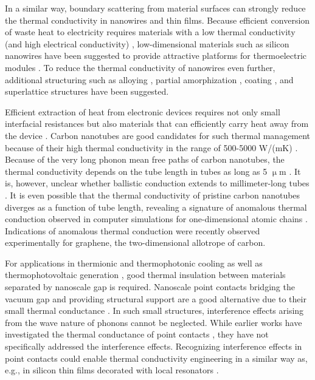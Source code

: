 In a similar way, boundary scattering from material surfaces can strongly reduce the thermal conductivity in nanowires and thin films. Because efficient conversion of waste heat to electricity requires materials with a low thermal conductivity (and high electrical conductivity) \cite{chen}, low-dimensional materials such as silicon nanowires have been suggested to provide attractive platforms for thermoelectric modules \cite{hochbaum08,boukai08}. To reduce the thermal conductivity of nanowires even further, additional structuring such as alloying \cite{garg11}, partial amorphization \cite{donadio09}, coating \cite{hu11}, and superlattice structures \cite{hu12} have been suggested.

Efficient extraction of heat from electronic devices requires not only small interfacial resistances but also materials that can efficiently carry heat away from the device \cite{pop10}. Carbon nanotubes  \cite{iijima91} are good candidates for such thermal management \cite{kumar11} because of their high thermal conductivity in the range of 500-5000 W/(mK) \cite{marconnet13}. Because of the very long phonon mean free paths of carbon nanotubes, the thermal conductivity depends on the tube length in tubes as long as 5 $\upmu$m \cite{chang08}. It is, however, unclear whether ballistic conduction extends to millimeter-long tubes \cite{marconnet13}. It is even possible that the thermal conductivity of pristine carbon nanotubes diverges as a function of tube length, revealing a signature of anomalous thermal conduction observed in computer simulations for one-dimensional atomic chains \cite{lepri03,mai07,dhar08}. Indications of anomalous thermal conduction were recently observed experimentally \cite{xu14} for graphene, the two-dimensional allotrope of carbon.

For applications in thermionic \cite{zeng06,westover08} and thermophotonic \cite{oksanen08} cooling as well as thermophotovoltaic generation \cite{dimatteo01}, good thermal insulation between materials separated by nanoscale gap is required. Nanoscale point contacts bridging the vacuum gap and providing structural support are a good alternative due to their small thermal conductance \cite{bartsch12}. In such small structures, interference effects arising from the wave nature of phonons cannot be neglected. While earlier works have investigated the thermal conductance of point contacts \cite{bartsch12,jeong12}, they have not specifically addressed the interference effects. Recognizing interference effects in point contacts could enable thermal conductivity engineering in a similar way as, e.g., in silicon thin films decorated with local resonators \cite{davis14}.

